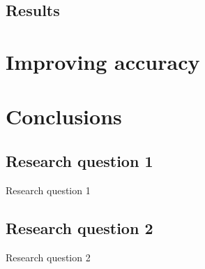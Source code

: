 \documentclass[pdf]{beamer}
\begin{document}
  \subsection{Results}

\section{Improving accuracy}

\section{Conclusions}
\subsection{Research question 1}
\begin{frame}{Research question 1}
\end{frame}

\subsection{Research question 2}
\begin{frame}{Research question 2}

\end{frame}
\end{document}

